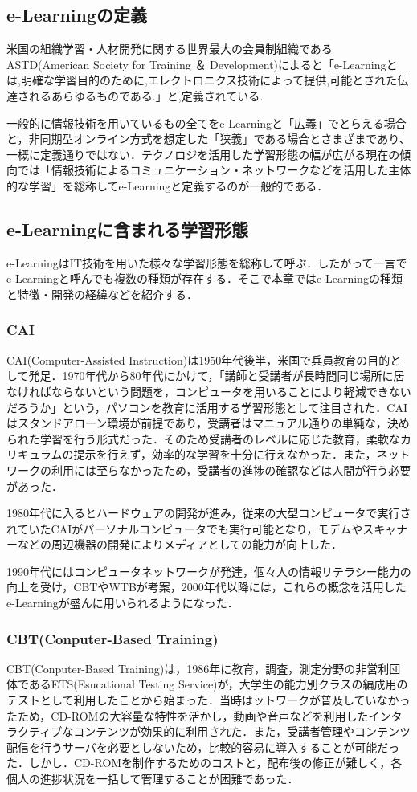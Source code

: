 \documentclass[a4j,12pt]{jsarticle}
\begin{document}
\subsection{e-Learningの定義}
米国の組織学習・人材開発に関する世界最大の会員制組織であるASTD(American Society for Training ＆ Development)によると「e-Learningとは,明確な学習目的のために,エレクトロニクス技術によって提供,可能とされた伝達されるあらゆるものである.」と,定義されている.

一般的に情報技術を用いているもの全てをe-Learningと「広義」でとらえる場合と，非同期型オンライン方式を想定した「狭義」である場合とさまざまであり、一概に定義通りではない．テクノロジを活用した学習形態の幅が広がる現在の傾向では「情報技術によるコミュニケーション・ネットワークなどを活用した主体的な学習」を総称してe-Learningと定義するのが一般的である．

\subsection{e-Learningに含まれる学習形態}
e-LearningはIT技術を用いた様々な学習形態を総称して呼ぶ．したがって一言でe-Learningと呼んでも複数の種類が存在する．そこで本章ではe-Learningの種類と特徴・開発の経緯などを紹介する．

\subsubsection{CAI}
CAI(Computer-Assisted Instruction)は1950年代後半，米国で兵員教育の目的として発足．1970年代から80年代にかけて，「講師と受講者が長時間同じ場所に居なければならないという問題を，コンピュータを用いることにより軽減できないだろうか」という，パソコンを教育に活用する学習形態として注目された．CAIはスタンドアローン環境が前提であり，受講者はマニュアル通りの単純な，決められた学習を行う形式だった．そのため受講者のレベルに応じた教育，柔軟なカリキュラムの提示を行えず，効率的な学習を十分に行えなかった．また，ネットワークの利用には至らなかったため，受講者の進捗の確認などは人間が行う必要があった．

1980年代に入るとハードウェアの開発が進み，従来の大型コンピュータで実行されていたCAIがパーソナルコンピュータでも実行可能となり，モデムやスキャナーなどの周辺機器の開発によりメディアとしての能力が向上した．

1990年代にはコンピュータネットワークが発達，個々人の情報リテラシー能力の向上を受け，CBTやWTBが考案，2000年代以降には，これらの概念を活用したe-Learningが盛んに用いられるようになった．

\subsubsection{CBT(Conputer-Based Training)}
CBT(Conputer-Based Training)は，1986年に教育，調査，測定分野の非営利団体であるETS(Esucational Testing Service)が，大学生の能力別クラスの編成用のテストとして利用したことから始まった．当時はットワークが普及していなかったため，CD-ROMの大容量な特性を活かし，動画や音声などを利用したインタラクティブなコンテンツが効果的に利用された．また，受講者管理やコンテンツ配信を行うサーバを必要としないため，比較的容易に導入することが可能だった．しかし．CD-ROMを制作するためのコストと，配布後の修正が難しく，各個人の進捗状況を一括して管理することが困難であった．
\end{document}

